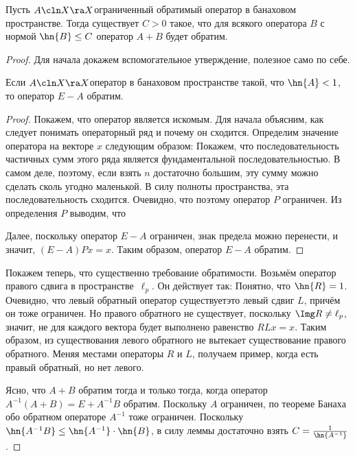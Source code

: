 \documentclass[a4paper]{article}
\begin{document}
\begin{theorem}
Пусть $A\cln X \ra X$\т ограниченный обратимый оператор в банаховом пространстве. Тогда
существует $C> 0$ такое, что для всякого оператора $B$ с нормой $\hn{B} \le C$ оператор $A + B$ будет обратим.
\end{theorem}
\begin{proof}
Для начала докажем вспомогательное утверждение, полезное само по себе.
\begin{lemma}
Если $A\cln X \ra X$\т оператор в банаховом пространстве такой, что $\hn{A} < 1$, то оператор $E - A$ обратим.
\end{lemma}
\begin{proof}
Покажем, что оператор
является искомым. Для начала объясним, как следует понимать операторный ряд и почему он сходится.
Определим значение оператора
на векторе $x$ следующим образом:
Покажем, что последовательность частичных сумм этого ряда является фундаментальной последовательностью.
В самом деле,
поэтому, если взять $n$ достаточно большим, эту сумму можно сделать сколь угодно маленькой.
В силу полноты пространства, эта последовательность сходится. Очевидно, что
поэтому оператор $P$ ограничен.
Из определения $P$ выводим, что

Далее, поскольку оператор $E-A$ ограничен, знак предела можно перенести, и значит, ${(E-A)Px = x}$.
Таким образом, оператор $E-A$ обратим.
\end{proof}

Покажем теперь, что существенно требование обратимости.
Возьмём оператор правого сдвига в пространстве~$\ell_p$. Он действует так:
Понятно, что $\hn{R} = 1$. Очевидно, что левый обратный оператор существует\т это левый сдвиг $L$,
причём он тоже ограничен. Но правого обратного не существует, поскольку $\Img R \neq \ell_p$, значит,
не для каждого вектора будет выполнено равенство $R L x=x$. Таким образом, из существования левого обратного
не вытекает существование правого обратного. Меняя местами операторы $R$ и $L$, получаем пример, когда
есть правый обратный, но нет левого.

Ясно, что $A+B$ обратим тогда и только тогда, когда оператор $A^{-1}(A+B) = E + A^{-1}B$ обратим.
Поскольку $A$ ограничен, по теореме Банаха обо обратном операторе $A^{-1}$ тоже ограничен.
Поскольку $\hn{A^{-1}B} \le \hn{A^{-1}} \cdot \hn{B}$, в силу леммы достаточно взять
$C  = \frac{1}{\hn{A^{-1}}}$.
\end{proof}
\end{document}

